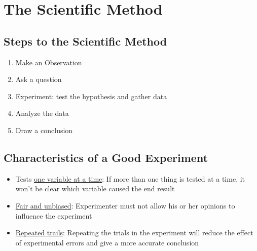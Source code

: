 \chapter{The Scientific Method}
\section{Steps to the Scientific Method}
\begin{enumerate}
    \item Make an Observation
    \item Ask a question
    \item Experiment: test the hypothesis and gather data
    \item Analyze the data
    \item Draw a conclusion
\end{enumerate}
\section{Characteristics of a Good Experiment}
\begin{itemize}
    \item Tests \underline{one variable at a time}: If more than one thing is tested at a time, it won't be clear which variable caused the end result
    \item \underline{Fair and unbiased}: Experimenter must not allow his or her opinions to influence the experiment
    \item \underline{Repeated trails}: Repeating the trials in the experiment will reduce the effect of experimental errors and give a more accurate conclusion
\end{itemize}
